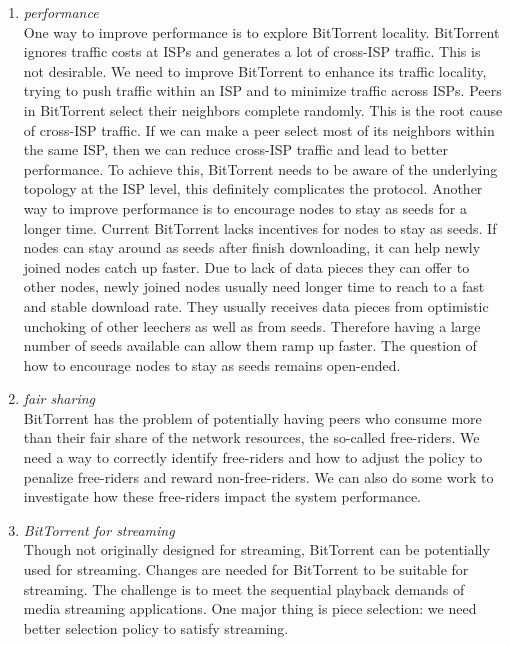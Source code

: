 \documentclass[11pt]{article}
\begin{document}
\begin{enumerate}
\item \emph{performance} \\
  One way to improve performance is to explore BitTorrent
  locality. BitTorrent ignores traffic costs at ISPs and generates a
  lot of cross-ISP traffic. This is not desirable. We need to improve
  BitTorrent to enhance its traffic locality,
  trying to push traffic within an ISP and to minimize traffic across
  ISPs. Peers in BitTorrent select their neighbors complete
  randomly. This is the root cause of cross-ISP traffic. If we can
  make a peer select most of its neighbors within the same ISP, then
  we can reduce cross-ISP traffic and lead to better performance. To
  achieve this, BitTorrent needs to be aware of the underlying
  topology at the ISP level, this definitely complicates the
  protocol. Another way to improve performance is to encourage nodes
  to stay as seeds for a longer time. Current BitTorrent lacks incentives for nodes to
  stay as seeds. If nodes can stay around as seeds after finish
  downloading, it can help newly joined nodes catch up faster. Due to
  lack of data pieces they can offer to other nodes, newly joined nodes
  usually need longer time to reach to a fast and stable download
  rate. They usually receives data pieces from optimistic unchoking of other
  leechers as well as from seeds. Therefore having a large number of
  seeds available can allow them ramp up faster. The question of how to
  encourage nodes to stay as seeds remains open-ended.

\item \emph{fair sharing} \\
  BitTorrent has the problem of potentially
  having peers who consume more than their fair share of the network
  resources, the so-called free-riders. We need a way to correctly
  identify free-riders and how to adjust the policy to penalize
  free-riders and reward non-free-riders. We can also do some work to
  investigate how these free-riders impact the system performance.

\item \emph{BitTorrent for streaming} \\
  Though not originally designed for streaming, BitTorrent can be
  potentially used for streaming. Changes are needed for BitTorrent to
  be suitable for streaming. The challenge is to meet the sequential
  playback demands of media streaming applications. 
  One major thing is piece selection: we
  need better selection policy to satisfy streaming.
\end{enumerate}

\vspace{1em}
\end{document}
